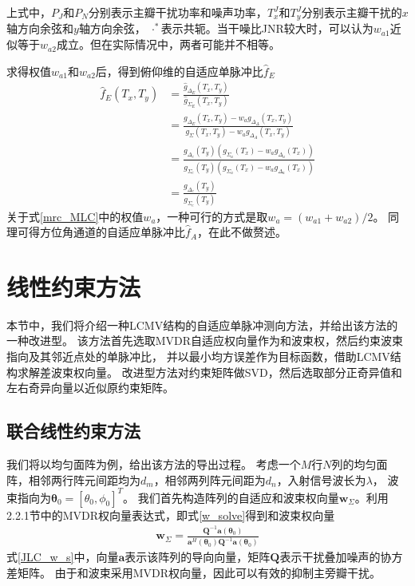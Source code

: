 \documentclass[master]{thesis-uestc}
\begin{document}
上式中，$P_J$和$P_N$分别表示主瓣干扰功率和噪声功率，$T_x^J$和$T_y^J$分别表示主瓣干扰的$x$轴方向余弦和$y$轴方向余弦，
$\cdot^*$表示共轭。当干噪比JNR较大时，可以认为$w_{a1}$近似等于$w_{a2}$成立。但在实际情况中，两者可能并不相等。

求得权值$w_{a1}$和$w_{a2}$后，得到俯仰维的自适应单脉冲比$\hat{f}_E$
\begin{equation}\label{mrc_MLC}
    \begin{aligned}
        \hat{f}_{E}\left(T_{x}, T_{y}\right) &=\frac{\hat{g}_{\Delta_{E}}\left(T_{x}, T_{y}\right)}{\hat{g}_{\Sigma_{E}}\left(T_{x}, T_{y}\right)} \\
        &=\frac{g_{\Delta_{E}}\left(T_{x}, T_{y}\right)-w_{a} g_{\Delta_{\Delta}}\left(T_{x}, T_{y}\right)}{g_{\Sigma}\left(T_{x}, T_{y}\right)-w_{a} g_{\Delta_{A}}\left(T_{x}, T_{y}\right)} \\
        &=\frac{g_{\Delta_{e}}\left(T_{y}\right)\left(g_{\Sigma_{a}}\left(T_{x}\right)-w_{a} g_{\Delta_{a}}\left(T_{x}\right)\right)}{g_{\Sigma_{e}}\left(T_{y}\right)\left(g_{\Sigma_{a}}\left(T_{x}\right)-w_{a} g_{\Delta_{a}}\left(T_{x}\right)\right)} \\
        &=\frac{g_{\Delta_{e}}\left(T_{y}\right)}{g_{\Sigma_{e}}\left(T_{y}\right)}
        \end{aligned}
\end{equation}
关于式\eqref{mrc_MLC}中的权值$w_a$，一种可行的方式是取$w_a=(w_{a1}+w_{a2})/2$。
同理可得方位角通道的自适应单脉冲比$\hat{f}_A$，在此不做赘述。

\section{线性约束方法}
本节中，我们将介绍一种LCMV结构的自适应单脉冲测向方法，并给出该方法的一种改进型。
该方法首先选取MVDR自适应权向量作为和波束权，然后约束波束指向及其邻近点处的单脉冲比，
并以最小均方误差作为目标函数，借助LCMV结构求解差波束权向量。
改进型方法对约束矩阵做SVD，然后选取部分正奇异值和左右奇异向量以近似原约束矩阵。

\subsection{联合线性约束方法}
我们将以均匀面阵为例，给出该方法的导出过程。
考虑一个$M$行$N$列的均匀面阵，相邻两行阵元间距均为$d_m$，相邻两列阵元间距为$d_n$，入射信号波长为$\lambda$，
波束指向为$\bm{\theta}_0=\left[\theta_0,\phi_0\right]^T$。
我们首先构造阵列的自适应和波束权向量$\bm{w}_\Sigma$。利用2.2.1节中的MVDR权向量表达式，即式\eqref{w_solve}得到和波束权向量
\begin{equation}\label{JLC_w_s}
    \begin{aligned}
        \bm{w}_\Sigma = \frac{\bm{Q}^{-1}\bm{a}(\bm{\theta}_0)}{\bm{a}^H(\bm{\theta}_0)\bm{Q}^{-1}\bm{a}(\bm{\theta}_0)}
    \end{aligned}
\end{equation}
式\eqref{JLC_w_s}中，向量$\bm{a}$表示该阵列的导向向量，矩阵$\bm{Q}$表示干扰叠加噪声的协方差矩阵。
由于和波束采用MVDR权向量，因此可以有效的抑制主旁瓣干扰。
\end{document}
